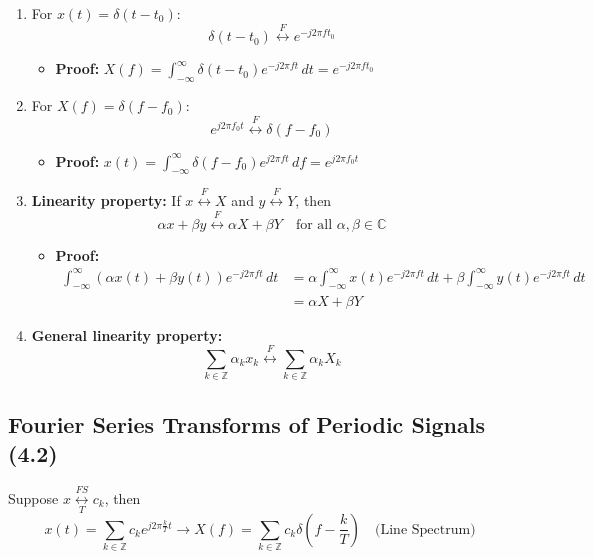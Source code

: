 \begin{definition}
\begin{enumerate}
    \item For \( x(t) = \delta(t - t_0) \):
    \begin{equation*}
        \delta(t - t_0) \overset{F}{\leftrightarrow} e^{-j 2 \pi f t_0} 
    \end{equation*}
    \begin{itemize}
        \item \textbf{Proof:} $X(f) = \int_{-\infty}^{\infty} \delta(t - t_0) e^{-j 2 \pi f t} \, dt = e^{-j 2 \pi f t_0}$
    \end{itemize}

    \item For \( X(f) = \delta(f - f_0) \):
    \begin{equation*}
        e^{j 2 \pi f_0 t} \overset{F}{\leftrightarrow} \delta(f - f_0)
    \end{equation*}
    \begin{itemize}
        \item \textbf{Proof:} $x(t) = \int_{-\infty}^{\infty} \delta(f - f_0) e^{j 2 \pi f t} \, df = e^{j 2 \pi f_0 t}$
    \end{itemize}

    \item \textbf{Linearity property:} If \( x \overset{F}{\leftrightarrow} X \) and \( y \overset{F}{\leftrightarrow} Y \), then
    \[
    \alpha x + \beta y \overset{F}{\leftrightarrow} \alpha X + \beta Y \quad \text{for all } \alpha, \beta \in \mathbb{C}
    \]
    \begin{itemize}
        \item \textbf{Proof:}
        \begin{align*}
            \int_{-\infty}^{\infty} \left( \alpha x(t) + \beta y(t) \right) e^{-j 2 \pi f t} \, dt &= \alpha \int_{-\infty}^{\infty} x(t) e^{-j 2 \pi f t} \, dt + \beta \int_{-\infty}^{\infty} y(t) e^{-j 2 \pi f t} \, dt \\
            &= \alpha X + \beta Y
        \end{align*}
    \end{itemize}
    \item \textbf{General linearity property:} 
    \[
    \sum_{k \in \mathbb{Z}} \alpha_k x_k \overset{F}{\leftrightarrow} \sum_{k \in \mathbb{Z}} \alpha_k X_k
    \]
    \end{enumerate}
\end{definition}

\subsection{Fourier Series Transforms of Periodic Signals (4.2)}
\begin{definition}
    Suppose \( x \underset{T}{\overset{FS}{\leftrightarrow}} c_k \), then
    \[
    x(t) = \sum_{k \in \mathbb{Z}} c_k e^{j 2 \pi \frac{k}{T} t} \rightarrow X(f) = \sum_{k \in \mathbb{Z}} c_k \delta\left(f - \frac{k}{T}\right) \quad \text{(Line Spectrum)}
    \]
\end{definition}

